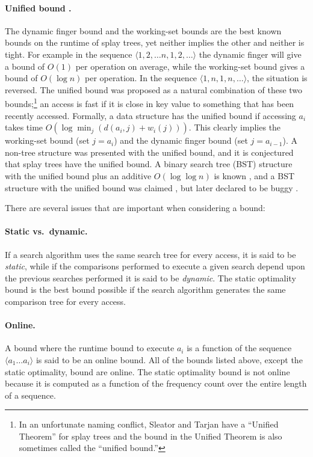 \documentclass{llncs}
\newcommand{\BigOh}[1]{O\!\left(#1\right)}
\begin{document}
\paragraph{Unified bound \cite{DBLP:journals/tcs/BadoiuCDI07}.} The dynamic finger bound and the working-set bounds are the best known bounds on the runtime of splay trees, yet neither implies the other and neither is tight. For example in the sequence $\langle 1,2,\ldots n, 1,2, \ldots \rangle$ the dynamic finger will give a bound of $\BigOh{1}$ per operation on average, while the working-set bound gives a bound of $\BigOh{\log n}$ per operation. In the sequence $\langle 1,n,1,n,\ldots \rangle$, the situation is reversed.  The unified bound was proposed as a natural combination of these two bounds;\footnote{In an unfortunate naming conflict, Sleator and Tarjan have a ``Unified Theorem'' for splay trees \cite[Theorem~5]{DBLP:journals/jacm/SleatorT85} and the bound in the Unified Theorem is also sometimes called the ``unified bound.''} 
an access is fast if it is close in key value to something that has been recently accessed. Formally, a data structure has the unified bound if accessing $a_i$ takes time $\BigOh{\log \min_j ( d(a_i,j)+w_i(j))}$. This clearly implies the working-set bound (set $j=a_i$) and the dynamic finger bound (set $j=a_{i-1}$). A non-tree structure was presented with the unified bound, and it is conjectured that splay trees have the unified bound. A binary search tree (BST) structure with the unified bound plus an additive $\BigOh{\log \log n}$ is known \cite{DBLP:conf/wads/DerryberryS09}, and a BST structure with the unified bound was claimed \cite{dthesis}, but later declared to be buggy \cite{wrong}.

\noindent
There are several issues that are important when considering a bound:

\paragraph{Static vs.~dynamic.} If a search algorithm uses the same search tree for every access, it is said to be \emph{static}, while if the comparisons performed to execute a given search depend upon the previous searches performed it is said to be \emph{dynamic}. The static optimality bound is the best bound possible if the search algorithm generates the same comparison tree for every access.

\paragraph{Online.} A bound where the runtime bound to execute $a_i$ is a function of the sequence $\langle a_1 \ldots a_i \rangle$ is said to be an online bound. All of the bounds listed above, except the static optimality, bound are online. The static optimality bound is not online because it is computed as a function of the frequency count over the entire length of a sequence.
\end{document}
